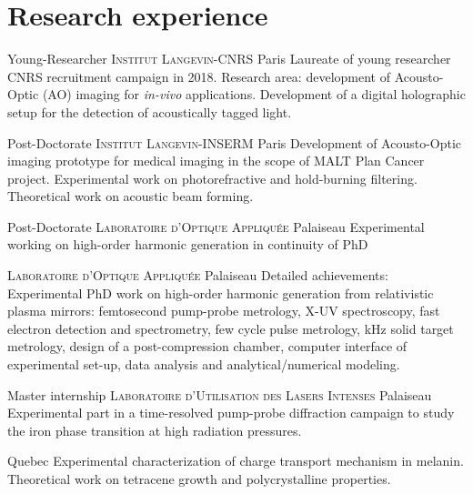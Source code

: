 \documentclass[11pt,a4paper,sans]{moderncv} %
\begin{document}

\section{Research experience}

{Young-Researcher}
{\textsc{Institut Langevin-CNRS}}
{Paris}
{}
{Laureate of young researcher CNRS recruitment campaign in 2018. Research area: development of  Acousto-Optic (AO) imaging for \textit{in-vivo} applications. Development of a digital holographic setup for the detection of acoustically tagged light.}


{Post-Doctorate}
{\textsc{Institut Langevin-INSERM}}
{Paris}
{}
{Development of Acousto-Optic imaging prototype for medical imaging in the scope of MALT Plan Cancer project. Experimental work on photorefractive and hold-burning filtering. Theoretical work on acoustic beam forming.}

{Post-Doctorate}
{\textsc{Laboratoire d'Optique Appliquée}}
{Palaiseau}
{}
{Experimental working on high-order harmonic generation in continuity of PhD}

{%
\textsc{Laboratoire d'Optique Appliquée}}
{%
Palaiseau}
{}
{%
Detailed achievements:
Experimental PhD work on high-order harmonic generation from relativistic plasma mirrors: femtosecond pump-probe metrology, X-UV spectroscopy, fast electron detection and spectrometry, few cycle pulse metrology, kHz solid target metrology, design of a post-compression chamber, computer interface of experimental set-up, data analysis and analytical/numerical modeling. 
}


{Master internship}
{\textsc{Laboratoire d'Utilisation des Lasers Intenses}}
{Palaiseau}
{}
{Experimental part in a time-resolved pump-probe diffraction campaign to study the iron phase transition at high radiation pressures. }




{Quebec}
{}
{Experimental characterization of charge transport mechanism in melanin. Theoretical work on tetracene growth and polycrystalline properties.}
\end{document}
